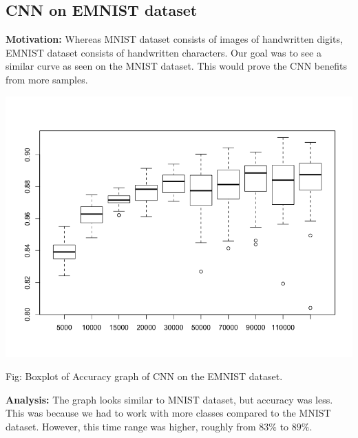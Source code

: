 \documentclass{article}
\begin{document}
\subsection*{CNN on EMNIST dataset}
\textbf{Motivation:} Whereas MNIST dataset consists of images of handwritten digits, EMNIST dataset consists of handwritten characters. Our goal was to see a similar curve as seen on the MNIST dataset. This would prove the CNN benefits from more samples.

\begin{center}
	\includegraphics[scale=0.35]{EMNIST_pure_CNN}
\end{center}
\begin{center}
	Fig: Boxplot of Accuracy graph of CNN on the EMNIST dataset.
\end{center}

\textbf{Analysis:} The graph looks similar to MNIST dataset, but accuracy was less. This was because we had to work with more classes compared to the MNIST dataset. However, this time range was higher, roughly from $83\%$ to $89\%$.
\end{document}

